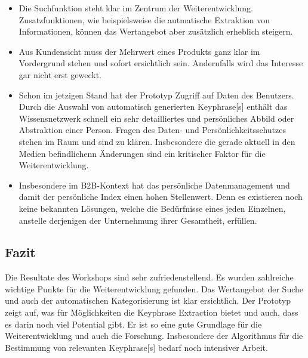 \begin{itemize}
    \item Die Suchfunktion steht klar im Zentrum der Weiterentwicklung. Zusatzfunktionen, wie beispielsweise die autmatische Extraktion von Informationen, können das Wertangebot aber zusätzlich erheblich steigern.
    \item Aus Kundensicht muss der Mehrwert eines Produkts ganz klar im Vordergrund stehen und sofort ersichtlich sein. Andernfalls wird das Interesse gar nicht erst geweckt.
    \item Schon im jetzigen Stand hat der Prototyp Zugriff auf Daten des Benutzers. Durch die Auswahl von automatisch generierten \gls{Keyphrase}[s] enthält das Wissensnetzwerk schnell ein sehr detailliertes und persönliches Abbild oder Abstraktion einer Person. Fragen des Daten- und Persönlichkeitsschutzes stehen im Raum und sind zu klären. Insbesondere die gerade aktuell in den Medien befindlichenn Änderungen sind ein kritischer Faktor für die Weiterentwicklung.
    \item Insbesondere im B2B-Kontext hat das persönliche Datenmanagement und damit der persönliche Index einen hohen Stellenwert. Denn es existieren noch keine bekannten Lösungen, welche die Bedürfnisse eines jeden Einzelnen, anstelle derjenigen der Unternehmung ihrer Gesamtheit, erfüllen. 
\end{itemize}


\subsection{Fazit}

Die Resultate des Workshops sind sehr zufriedenstellend. Es wurden zahlreiche wichtige Punkte für die Weiterentwicklung gefunden. Das Wertangebot der Suche und auch der automatischen Kategorisierung ist klar ersichtlich. Der Prototyp zeigt auf, was für Möglichkeiten die \gls{Keyphrase} Extraction bietet und auch, dass es darin noch viel Potential gibt. Er ist so eine gute Grundlage für die Weiterentwicklung und auch die Forschung. Insbesondere der Algorithmus für die Bestimmung von relevanten \gls{Keyphrase}[s] bedarf noch intensiver Arbeit.

